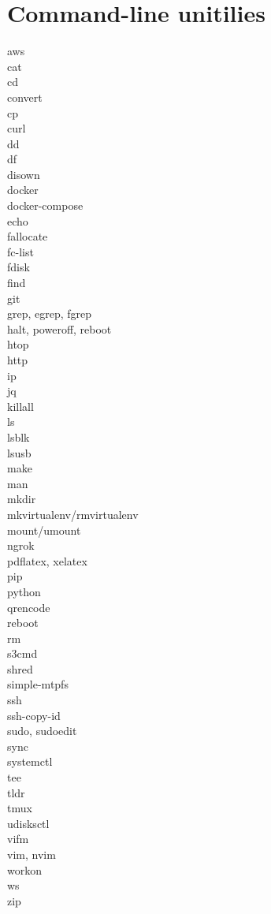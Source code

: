 \documentclass [8pt] {extarticle}
\begin{document}
    \section {Command-line unitilies}

    aws \\
    cat \\
    cd \\
    convert \\
    cp \\
    curl \\
    dd \\
    df \\
    disown  \\
    docker \\
    docker-compose \\
    echo \\
    fallocate \\
    fc-list \\
    fdisk \\
    find \\
    git \\
    grep, egrep, fgrep \\
    halt, poweroff, reboot \\
    htop \\
    http \\
    ip \\
    jq \\
    killall \\
    ls \\
    lsblk \\
    lsusb \\
    make \\
    man \\
    mkdir \\
    mkvirtualenv/rmvirtualenv \\
    mount/umount \\
    ngrok \\
    pdflatex, xelatex \\
    pip \\
    python \\
    qrencode \\
    reboot \\
    rm \\
    s3cmd \\
    shred \\
    simple-mtpfs \\
    ssh \\
    ssh-copy-id \\
    sudo, sudoedit \\
    sync \\
    systemctl \\
    tee \\
    tldr \\
    tmux \\
    udisksctl \\
    vifm \\
    vim, nvim \\
    workon \\
    ws \\
    zip \\
\end{document}
